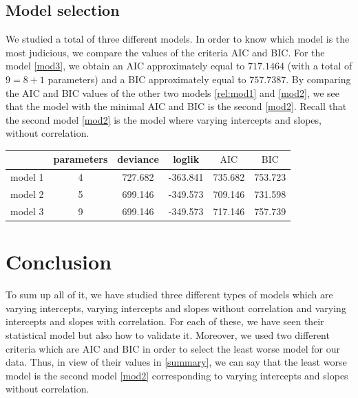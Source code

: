 \documentclass{article}
\newcommand*{\AIC}{\mathrm{AIC}}
\newcommand*{\BIC}{\mathrm{BIC}}
\begin{document}
\subsection{Model selection}
We studied a total of three different models. In order to know which model is the most judicious, we compare the values of the criteria AIC and BIC.
For the model \eqref{mod3}, we obtain an AIC approximately equal to $717.1464$ (with a total of $9=8+1$ parameters) and a BIC approximately equal to $757.7387$. By comparing the AIC and BIC values of the other two models \eqref{rel:mod1} and \eqref{mod2}, we see that the model with the minimal AIC and BIC is the second \eqref{mod2}. Recall that the second model \eqref{mod2} is the model where varying intercepts and slopes, without correlation.

\begin{center}\label{summary}
    \begin{tabular}{|c|c|c|c|c|c|}
    \hline
         & parameters & deviance & loglik & $\AIC$ & $\BIC$ \\
         \hline \hline
        model 1 & 4 & 727.682 & -363.841 & 735.682 & 753.723\\
        model 2 & 5 & 699.146 & -349.573 & 709.146 & 731.598\\
        model 3 & 9 & 699.146 & -349.573 &717.146 & 757.739\\
        \hline
    \end{tabular}
\end{center}

\section*{Conclusion}
To sum up all of it, we have studied three different types of models which are
varying intercepts, varying intercepts and slopes without correlation and varying intercepts and slopes with correlation. 
For each of these, we have seen their statistical model but also how to validate it. Moreover, we used two different criteria which are AIC and BIC in order to select the least worse model for our data. Thus, in view  of their values in \ref{summary}, we can say that the least worse model is the second model \eqref{mod2} corresponding to varying intercepts and slopes without correlation.


\nocite{*}
\printbibliography
\end{document}
